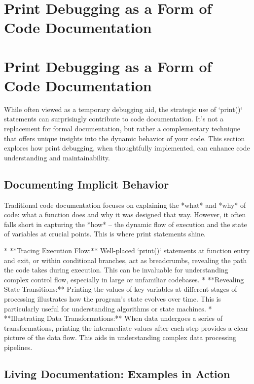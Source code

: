 \documentclass{article}
\begin{document}
{{{{\section*{Print Debugging as a Form of Code Documentation} %
\label{chapter-10-10-Print_Debugging_as_a_Form_of_Code_Docume}

\section*{Print Debugging as a Form of Code Documentation}

While often viewed as a temporary debugging aid, the strategic use of `print()` statements can surprisingly contribute to code documentation. It's not a replacement for formal documentation, but rather a complementary technique that offers unique insights into the dynamic behavior of your code. This section explores how print debugging, when thoughtfully implemented, can enhance code understanding and maintainability.

\subsection*{Documenting Implicit Behavior}

Traditional code documentation focuses on explaining the *what* and *why* of code: what a function does and why it was designed that way. However, it often falls short in capturing the *how* – the dynamic flow of execution and the state of variables at crucial points. This is where print statements shine.

*   **Tracing Execution Flow:** Well-placed `print()` statements at function entry and exit, or within conditional branches, act as breadcrumbs, revealing the path the code takes during execution. This can be invaluable for understanding complex control flow, especially in large or unfamiliar codebases.
*   **Revealing State Transitions:** Printing the values of key variables at different stages of processing illustrates how the program's state evolves over time. This is particularly useful for understanding algorithms or state machines.
*   **Illustrating Data Transformations:**  When data undergoes a series of transformations, printing the intermediate values after each step provides a clear picture of the data flow. This aids in understanding complex data processing pipelines.

\subsection*{Living Documentation: Examples in Action}

}}}}
\end{document}
